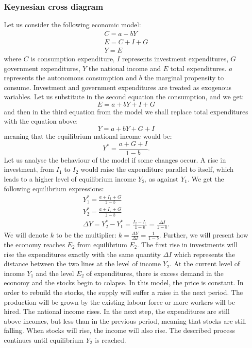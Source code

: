 \documentclass[a4paper,12pt]{report}
\begin{document}
\subsubsection{Keynesian cross diagram}
Let us consider the following economic model:
\begin{align*}
 C=a+bY\\
 E=C+I+G\\
 Y=E
\end{align*}
where $C$ is consumption expenditure, $I$ represents investment expenditures, $G$ government expenditures, $Y$ the national income and $E$ total expenditures. $a$ represents the autonomous consumption and $b$ the marginal propensity to consume.
Investment and government expenditures are treated as exogenous variables. Let us substitute in the second equation the consumption, and we get:
\begin{equation*}
 E=a+bY+I+G
\end{equation*}
and then in the third equation from the model we shall replace total expenditures with the equation above:
\begin{equation*}
 Y=a+bY+G+I
\end{equation*}
meaning that the equilibrium national income would be:
\begin{equation}
 Y^{*}=\frac{a+G+I}{1-b}.
\end{equation}
Let us analyse the behaviour of the model if some changes occur. A rise in investment, from $I_{1}$ to $I_{2}$ would raise the expenditure parallel to itself, which leads to a higher level of equilibrium income $Y_{2}$, as against $Y_{1}$. We get the following equilibrium expressions:
\begin{align*}
 Y_{1}^{*}=\frac{a+I_{1}+G}{1-b}\\
Y_{2}^{*}=\frac{a+I_{2}+G}{1-b}\\
\Delta Y=Y^{*}_{2}-Y^{*}_{1}=\frac{I_{2}-I_{1}}{1-b}=\frac{\Delta I}{1-b}.
 \end{align*}
We will denote $k$ to be the multiplier: $k=\frac{\Delta Y}{\Delta I}=\frac{1}{1-b}$. Further, we will present how the economy reaches $E_{2}$ from equilibrium $E_{2}$. The first rise in investments will rise the expenditures exactly with the same quantity $\Delta I$ which represents the distance between the two lines at the level of income $Y_{2}$. At the current level of income $Y_{1}$ and the level $E_{2}$ of expenditures, there is excess demand in the economy and the stocks begin to colapse. In this model, the price is constant. In order to rebuild the stocks, the supply will suffer a raise in the next period. The production will be grown by the existing labour force or more workers will be hired. The national income rises. In the next step, the expenditures are still above incomes, but less than in the previous period, meaning that stocks are still falling. When stocks will rise, the income will also rise. The described process continues until equilibrium $Y_{2}$ is reached.
\end{document}
